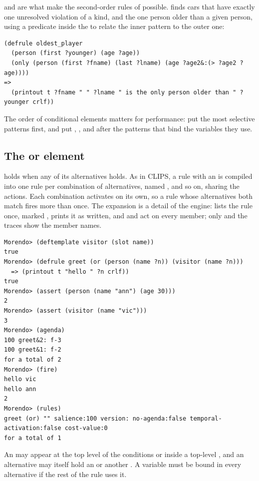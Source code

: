  and  are what make the second-order rules of
 possible.  finds cars that have
exactly one unresolved violation of a kind, and  the one
person older than a given person, using a predicate inside the
 to relate the inner pattern to the outer one:

\begin{lstlisting}
(defrule oldest_player
  (person (first ?younger) (age ?age))
  (only (person (first ?fname) (last ?lname) (age ?age2&:(> ?age2 ?age))))
=>
  (printout t ?fname " " ?lname " is the only person older than " ?younger crlf))
\end{lstlisting}

The order of conditional elements matters for performance: put the most
selective patterns first, and put , ,  and
 after the patterns that bind the variables they use.

\subsection{The or element}
\label{sec:or-ce}

 holds when any of its alternatives holds. As in CLIPS, a
rule with an  is compiled into one rule per combination of
alternatives, named ,  and so on, sharing the
actions. Each combination activates on its own, so a rule whose
alternatives both match fires more than once. The expansion is a detail
of the engine:  lists the rule once, marked ,
 prints it as written, and 
and  act on every member; only  and the
 traces show the member names.

\begin{lstlisting}[style=shell]
Morendo> (deftemplate visitor (slot name))
true
Morendo> (defrule greet (or (person (name ?n)) (visitor (name ?n)))
  => (printout t "hello " ?n crlf))
true
Morendo> (assert (person (name "ann") (age 30)))
2
Morendo> (assert (visitor (name "vic")))
3
Morendo> (agenda)
100 greet&2: f-3
100 greet&1: f-2
for a total of 2
Morendo> (fire)
hello vic
hello ann
2
Morendo> (rules)
greet (or) "" salience:100 version: no-agenda:false temporal-activation:false cost-value:0
for a total of 1
\end{lstlisting}

An  may appear at the top level of the conditions or inside a
top-level , and an alternative may itself hold an  or
another . A variable must be bound in every alternative if the
rest of the rule uses it.

